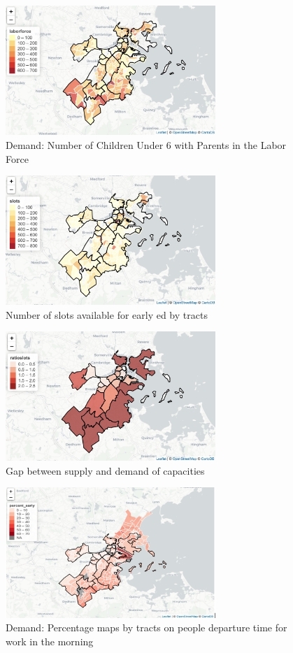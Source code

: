 \documentclass[10pt,letterpaper]{article}
\begin{document}
\begin{figure}
\centering
\includegraphics[width=3.12500in]{fig1.png}
\caption{Demand: Number of Children Under 6 with Parents in the Labor
Force}
\end{figure}

\begin{figure}
\centering
\includegraphics[width=3.12500in]{Fig 2, slots.png}
\caption{Number of slots available for early ed by tracts}
\end{figure}

\begin{figure}
\centering
\includegraphics[width=3.12500in]{Fig 3, ratioslots.png}
\caption{Gap between supply and demand of capacities}
\end{figure}

\begin{figure}
\centering
\includegraphics[width=3.12500in]{fig4.png}
\caption{Demand: Percentage maps by tracts on people departure time for
work in the morning}
\end{figure}
\end{document}
